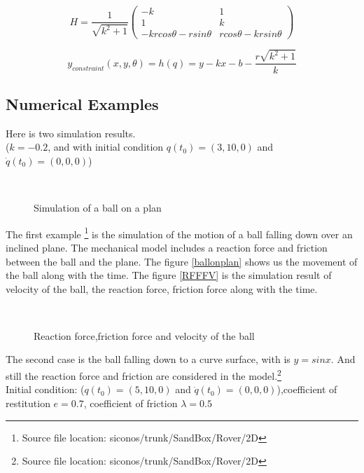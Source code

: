 \begin{equation}
H=\frac{1}{\sqrt{k^2+1}}\begin{pmatrix}
-k & 1 \\
1 & k \\
-krcos\theta-rsin\theta & rcos\theta-krsin\theta
\end{pmatrix}
\end{equation}

\begin{equation}
y_{constraint}(x,y,\theta)=h(q)=y-kx-b-\frac{r\sqrt{k^2+1}}{k}
\end{equation}


\subsection{Numerical Examples}
Here is two simulation results.\\
($k=-0.2$, and with initial condition $q(t_0)=(3,10,0)$ and $\dot{q}(t_0)=(0,0,0)$)

\begin{figure}[H]
\\
\caption{Simulation of a ball on a plan}
\label{ballonplan}
\end{figure}

The first example \footnote{Source file location: siconos/trunk/SandBox/Rover/2D} is the simulation of the motion of a ball falling down over an inclined plane. The mechanical model includes a reaction force and friction between the ball and the plane. The figure \eqref{ballonplan} shows us the movement of the ball along with the time. The figure \eqref{RFFFV} is the simulation result of velocity of the ball, the reaction force, friction force along with the time. 

\begin{figure}
\\
\caption{Reaction force,friction force and velocity of the ball}
\label{RFFFV}
\end{figure}



The second case is the ball falling down to a curve surface, with is $y=sinx$. And still the reaction force and friction are considered in the model.\footnote{Source file location: siconos/trunk/SandBox/Rover/2D}\\

Initial condition: ($q(t_0)=(5,10,0)$ and $\dot{q}(t_0)=(0,0,0)$),coefficient of restitution $e=0.7$, coefficient of friction $\lambda=0.5$

